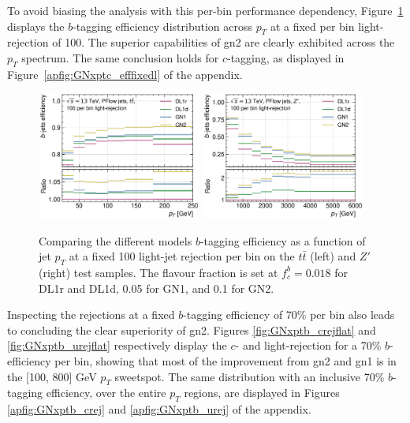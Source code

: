To avoid biasing the analysis with this per-bin performance dependency, Figure~\ref{fig:GNxptb_efffixedl} displays the $b$-tagging efficiency distribution across $p_T$ at a fixed per bin light-rejection of 100. The superior capabilities of \gls{gn2} are clearly exhibited across the $p_T$ spectrum. The same conclusion holds for $c$-tagging, as displayed in Figure~\ref{apfig:GNxptc_efffixedl} of the appendix. 
\begin{figure}[h!]
  \centering
  \includegraphics[width=0.48\textwidth]{Images/FTAG/GN/GN2/pt_plots/pt_ttbar_b_eff_fixedlight.png}
  \includegraphics[width=0.48\textwidth]{Images/FTAG/GN/GN2/pt_plots/pt_zp_b_eff_fixedlight.png}
  \caption{Comparing the different models $b$-tagging efficiency as a function of jet $p_T$ at a fixed 100 light-jet rejection per bin on the $t\bar{t}$ (left) and $Z'$ (right) test samples. The flavour fraction is set at $f^b_c = 0.018$ for DL1r and DL1d, 0.05 for GN1, and 0.1 for GN2.}
  \label{fig:GNxptb_efffixedl}
\end{figure} 

Inspecting the rejections at a fixed $b$-tagging efficiency of 70\% per bin also leads to concluding the clear superiority of \gls{gn2}. Figures \ref{fig:GNxptb_crejflat} and \ref{fig:GNxptb_urejflat} respectively display the $c$- and light-rejection for a 70\% $b$-efficiency per bin, showing that most of the improvement from \gls{gn2} and \gls{gn1} is in the [100, 800] GeV $p_T$ sweetspot. The same distribution with an inclusive 70\% $b$-tagging efficiency, over the entire $p_T$ regions, are displayed in Figures \ref{apfig:GNxptb_crej} and \ref{apfig:GNxptb_urej} of the appendix. 

